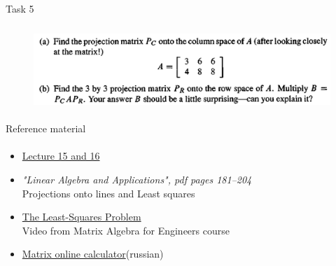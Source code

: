 \documentclass[aspectratio=169]{beamer}
\newcommand{\fbckg}[1]{\usebackgroundtemplate{\texttt{[image: \#1]}}}%
\begin{document}
    \begin{frame}[t]{Task 5}
        \framesubtitle{}
        \begin{figure}[H]
            \centering\includegraphics[height=3cm,width=1\textwidth,keepaspectratio]{5.png}
            \label{fig:5.png}
        \end{figure}
    \end{frame}
    

\begin{frame}[t]{Reference material}
    \framesubtitle{}
    \Large
    \begin{itemize}
        \item \href{https://www.youtube.com/watch?v=Y_Ac6KiQ1t0&list=PL49CF3715CB9EF31D&index=15}{Lecture 15 and 16}
        \item \textit{"Linear Algebra and Applications", pdf pages 181--204 }\\ Projections onto lines and Least squares
        \item \href{https://www.coursera.org/lecture/matrix-algebra-engineers/the-least-squares-problem-I56Qy}{The Least-Squares Problem}\\ Video from Matrix Algebra for Engineers course
        \item \href{https://matworld.ru/calculator/matrix-calculator-1.php}{Matrix online calculator}(russian)
    \end{itemize}
\end{frame}

\usebackgroundtemplate{}
% 

\fbckg{fibeamer/figs/last_page.png}
\frame[plain]{}
\end{document}

